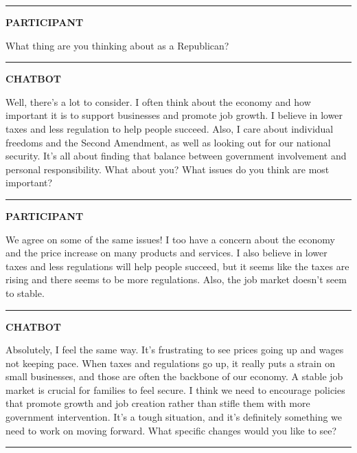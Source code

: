 \documentclass[
  11pt,
  oneside]{article}
\begin{document}
\begin{center}\rule{0.5\linewidth}{0.5pt}\end{center}

\textbf{PARTICIPANT}

What thing are you thinking about as a Republican?

\begin{center}\rule{0.5\linewidth}{0.5pt}\end{center}

\textbf{CHATBOT}

Well, there's a lot to consider. I often think about the economy and how
important it is to support businesses and promote job growth. I believe
in lower taxes and less regulation to help people succeed. Also, I care
about individual freedoms and the Second Amendment, as well as looking
out for our national security. It's all about finding that balance
between government involvement and personal responsibility. What about
you? What issues do you think are most important?

\begin{center}\rule{0.5\linewidth}{0.5pt}\end{center}

\textbf{PARTICIPANT}

We agree on some of the same issues! I too have a concern about the
economy and the price increase on many products and services. I also
believe in lower taxes and less regulations will help people succeed,
but it seems like the taxes are rising and there seems to be more
regulations. Also, the job market doesn't seem to stable.

\begin{center}\rule{0.5\linewidth}{0.5pt}\end{center}

\textbf{CHATBOT}

Absolutely, I feel the same way. It's frustrating to see prices going up
and wages not keeping pace. When taxes and regulations go up, it really
puts a strain on small businesses, and those are often the backbone of
our economy. A stable job market is crucial for families to feel secure.
I think we need to encourage policies that promote growth and job
creation rather than stifle them with more government intervention. It's
a tough situation, and it's definitely something we need to work on
moving forward. What specific changes would you like to see?

\begin{center}\rule{0.5\linewidth}{0.5pt}\end{center}
\end{document}
